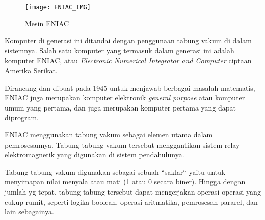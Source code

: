 \begin{figure}[h]
    \centering
    \texttt{[image: ENIAC\_IMG]}
    \caption{Mesin ENIAC}
    \label{fig:ENIAC_IMG}
\end{figure}

Komputer di generasi ini ditandai dengan penggunaan tabung vakum di dalam sistemnya.
Salah satu komputer yang termasuk dalam generasi ini adalah komputer ENIAC, atau
\textit{Electronic Numerical Integrator and Computer} ciptaan Amerika Serikat.

Dirancang dan dibuat pada 1945 untuk menjawab berbagai masalah matematis,
ENIAC juga merupakan komputer elektronik \textit{general purpose} atau
komputer umum yang pertama, dan juga merupakan komputer pertama yang dapat diprogram.

ENIAC menggunakan tabung vakum sebagai elemen utama dalam pemrosesannya.
Tabung-tabung vakum tersebut menggantikan sistem relay elektromagnetik yang digunakan
di sistem pendahulunya.

Tabung-tabung vakum digunakan sebagai sebuah ``saklar`` yaitu untuk menyimapan nilai
menyala atau mati (1 atau 0 secara biner). Hingga dengan jumlah yg tepat, tabung-tabung
tersebut dapat mengerjakan operasi-operasi yang cukup rumit, seperti
logika boolean, operasi aritmatika, pemrosesan pararel, dan lain sebagainya.
